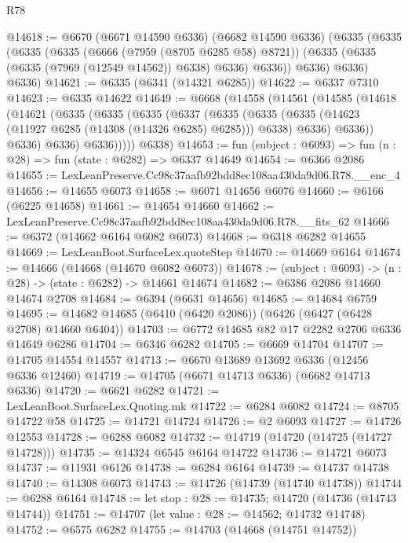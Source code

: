 \begin{lexlean}{R78}
\begin{coremodule}
@14618 := @6670
    (@6671 @14590 @6336)
    (@6682 @14590 @6336)
    (@6335
      (@6335
        (@6335
          (@6335
            (@6666 (@7959 (@8705 @6285 @58) @8721))
            (@6335 (@6335 (@6335 (@7969 (@12549 @14562)) @6338) @6336) @6336))
          @6336)
        @6336)
      @6336)
@14621 := @6335 (@6341 (@14321 @6285))
@14622 := @6337 @7310
@14623 := @6335 @14622
@14649 := @6668
    (@14558
      (@14561
        (@14585
          (@14618
            (@14621
              (@6335
                (@6335
                  (@6335
                    (@6337
                      (@6335
                        (@6335
                          (@6335 (@14623 (@11927 @6285 (@14308 (@14326 @6285) @6285))) @6338)
                          @6336)
                        @6336))
                    @6336)
                  @6336)
                @6336)))))
      @6338)
@14653 := fun (subject : @6093) => fun (n : @28) => fun (state : @6282) => @6337 @14649
@14654 := @6366 @2086
@14655 := LexLeanPreserve.Cc98c37aafb92bdd8ec108aa430da9d06.R78.__enc_4
@14656 := @14655 @6073
@14658 := @6071 @14656 @6076
@14660 := @6166 (@6225 @14658)
@14661 := @14654 @14660
@14662 := LexLeanPreserve.Cc98c37aafb92bdd8ec108aa430da9d06.R78.__fits_62
@14666 := @6372 (@14662 @6164 @6082 @6073)
@14668 := @6318 @6282 @14655
@14669 := LexLeanBoot.SurfaceLex.quoteStep
@14670 := @14669 @6164
@14674 := @14666 (@14668 (@14670 @6082 @6073))
@14678 := (subject : @6093) -> (n : @28) -> (state : @6282) -> @14661 @14674
@14682 := @6386 @2086 @14660 @14674 @2708
@14684 := @6394 (@6631 @14656)
@14685 := @14684 @6759
@14695 := @14682 @14685 (@6410 (@6420 @2086)) (@6426 (@6427 (@6428 @2708) @14660 @6404))
@14703 := @6772 @14685 @82 @17 @2282 @2706 @6336 @14649 @6286
@14704 := @6346 @6282
@14705 := @6669 @14704
@14707 := @14705 @14554 @14557
@14713 := @6670 @13689 @13692 @6336 (@12456 @6336 @12460)
@14719 := @14705 (@6671 @14713 @6336) (@6682 @14713 @6336)
@14720 := @6621 @6282
@14721 := LexLeanBoot.SurfaceLex.Quoting.mk
@14722 := @6284 @6082
@14724 := @8705 @14722 @58
@14725 := @14721 @14724
@14726 := @2 @6093
@14727 := @14726 @12553
@14728 := @6288 @6082
@14732 := @14719 (@14720 (@14725 (@14727 @14728)))
@14735 := @14324 @6545 @6164 @14722
@14736 := @14721 @6073
@14737 := @11931 @6126
@14738 := @6284 @6164
@14739 := @14737 @14738
@14740 := @14308 @6073
@14743 := @14726 (@14739 (@14740 @14738))
@14744 := @6288 @6164
@14748 := let stop : @28 := @14735; @14720 (@14736 (@14743 @14744))
@14751 := @14707 (let value : @28 := @14562; @14732 @14748)
@14752 := @6575 @6282
@14755 := @14703 (@14668 (@14751 @14752))

\end{coremodule}
\end{lexlean}
